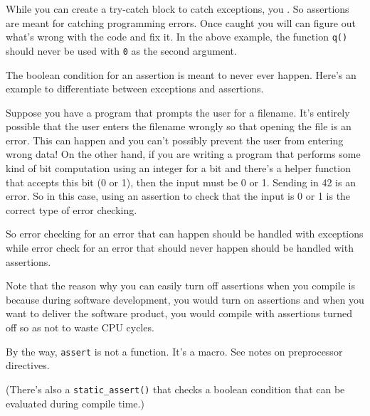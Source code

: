 While you can create a try-catch block to catch exceptions, you
. So assertions are meant for catching
programming errors. Once caught you will can figure out
what's wrong with the code and fix it. In the above
example, the function \texttt{q()} should never be used with \texttt{0} as
the second argument.

The boolean condition for an assertion is meant to never ever happen.
Here's an example to differentiate between exceptions
and assertions.

Suppose you have a program that prompts the user for a filename.
It's entirely possible that the user enters the filename
wrongly so that opening the file is an error. This can happen and you
can't possibly prevent the user from entering wrong
data! On the other hand, if you are writing a program that performs some
kind of bit computation using an integer for a bit and
there's a helper function that accepts this bit (0 or
1), then the input must be 0 or 1. Sending in 42 is an error. So in this
case, using an assertion to check that the input is 0 or 1 is the
correct type of error checking.

So error checking for an error that can happen should be handled with
exceptions while error check for an error that should never happen
should be handled with assertions.

Note that the reason why you can easily turn off assertions when you
compile is because during software development, you would turn on
assertions and when you want to deliver the software product, you would
compile with assertions turned off so as not to waste CPU cycles.

By the way, \texttt{assert} is not a function. It's a
macro. See notes on preprocessor directives.

(There's also a \verb!static_assert()! that checks a
boolean condition that can be evaluated during compile time.)
